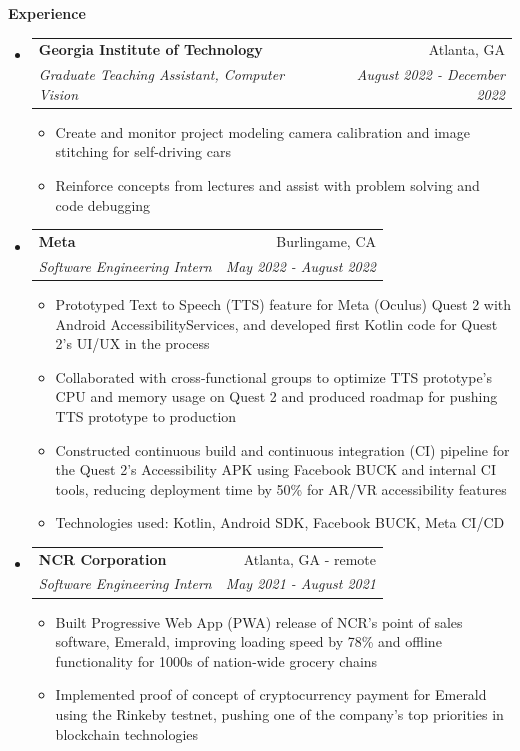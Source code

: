 \documentclass[letterpaper,10pt]{article}
\makeatletter
\newcommand{\resitem}[1]{\item #1 \vspace{-3.5pt}}  %
\newcommand{\resheading}[1]{{\large \colorbox{mygrey}{\begin{minipage}{0.989\textwidth}{\textbf{#1 \vphantom{p\^{E}}}}\end{minipage}}}}
\newcommand{\ressubheading}[4]{
\begin{tabular*}{7.0in}{l@{\extracolsep{\fill}}r}  
		\textbf{#1} & #2 \\
		\textit{#3} & \textit{#4} \\
\end{tabular*}\vspace{-6pt}}  %
\makeatother
\begin{document}

\resheading{Experience}

\begin{itemize}
\item
    \ressubheading{Georgia Institute of Technology}{Atlanta, GA}{Graduate Teaching Assistant, Computer Vision}{August 2022 - December 2022}
    \begin{itemize}
        \resitem{Create and monitor project modeling camera calibration and image stitching for self-driving cars}
        \resitem{Reinforce concepts from lectures and assist with problem solving and code debugging}
    \end{itemize}
\item
    \ressubheading{Meta}{Burlingame, CA}{Software Engineering Intern}{May 2022 - August 2022}
    \begin{itemize}
        \resitem{Prototyped Text to Speech (TTS) feature for Meta (Oculus) Quest 2 with Android AccessibilityServices, and developed first Kotlin code for Quest 2's UI/UX in the process}
        \resitem{Collaborated with cross-functional groups to optimize TTS prototype's CPU and memory usage on Quest 2 and produced roadmap for pushing TTS prototype to production}
        \resitem{Constructed continuous build and continuous integration (CI) pipeline for the Quest 2's Accessibility APK using Facebook BUCK and internal CI tools, reducing deployment time by 50\% for AR/VR accessibility features}
        \resitem{Technologies used: Kotlin, Android SDK, Facebook BUCK, Meta CI/CD}
    \end{itemize}
\item
    \ressubheading{NCR Corporation}{Atlanta, GA - remote}{Software Engineering Intern}{May 2021 - August 2021}
    \begin{itemize}
        \resitem{Built Progressive Web App (PWA) release of NCR's point of sales software, Emerald, improving loading speed by 78\% and offline functionality for 1000s of nation-wide grocery chains}
        \resitem{Implemented proof of concept of cryptocurrency payment for Emerald using the Rinkeby testnet, pushing one of the company's top priorities in blockchain technologies}

\end{itemize}
\end{itemize}
\end{document}

